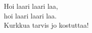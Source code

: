 
            Hoi laari laari laa, \\
            hoi laari laari laa. \\
            Kurkkua tarvis jo kostuttaa! \\
